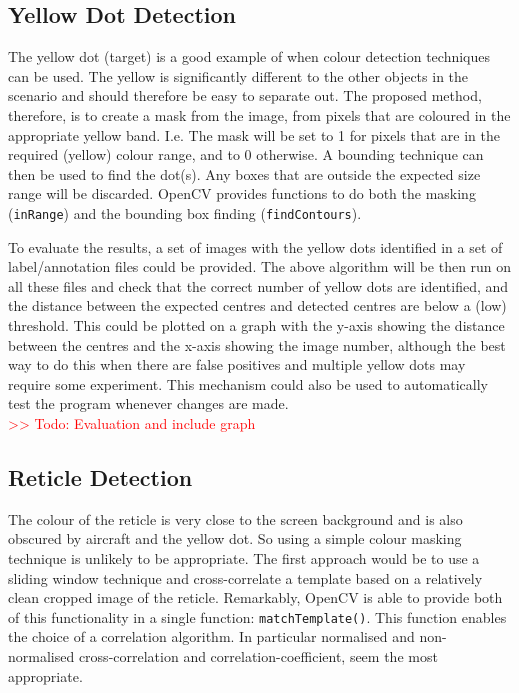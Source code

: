 \documentclass[final]{cmpreport_02}
\begin{document}
\subsection{Yellow Dot Detection}

The yellow dot (target) is a good example of when colour detection techniques can be used. The yellow is significantly different to the other objects in the scenario and should therefore be easy to separate out. The proposed method, therefore, is to create a mask from the image, from pixels that are coloured in the appropriate yellow band. I.e. The mask will be set to 1 for pixels that are in the required (yellow) colour range, and to 0 otherwise. A bounding technique can then be used to find the dot(s). Any boxes that are outside the expected size range will be discarded. OpenCV provides functions to do both the masking (\verb|inRange|) and the bounding box finding (\verb|findContours|).

To evaluate the results, a set of images with the yellow dots identified in a set of label/annotation files could be provided. The above algorithm will be then run on all these files and check that the correct number of yellow dots are identified, and the distance between the expected centres and detected centres are below a (low) threshold. This could be plotted on a graph with the y-axis showing the distance between the centres and the x-axis showing the image number, although the best way to do this when there are false positives and multiple yellow dots may require some experiment. This mechanism could also be used to automatically test the program whenever changes are made.
\\
\textcolor{red}{>> Todo: Evaluation and include graph}

\subsection{Reticle Detection}

The colour of the reticle is very close to the screen background and is also obscured by aircraft and the yellow dot. So using a simple colour masking technique is unlikely to be appropriate. The first approach would be to use a sliding window technique and cross-correlate a template based on a relatively clean cropped image of the reticle. Remarkably, OpenCV is able to provide both of this functionality in a single function: \verb|matchTemplate()|. This function enables the choice of a correlation algorithm. In particular normalised and non-normalised cross-correlation and correlation-coefficient, seem the most appropriate.
\end{document}
